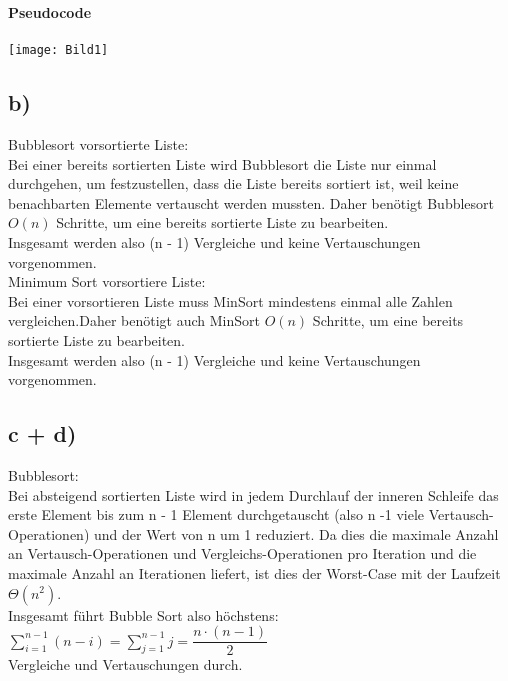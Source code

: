 \documentclass[enabledeprecatedfontcommands, a4paper]{scrartcl}
\begin{document}
\textbf{Pseudocode}\\
\\
\texttt{[image: Bild1]}\\
\newpage
\subsection*{b)}
Bubblesort vorsortierte Liste:\\
Bei einer bereits sortierten Liste wird Bubblesort die Liste nur einmal durchgehen, um festzustellen, dass die Liste bereits sortiert ist, weil keine benachbarten Elemente vertauscht werden mussten. Daher benötigt Bubblesort   ${O}(n)$  Schritte, um eine bereits sortierte Liste zu bearbeiten.\\
Insgesamt werden also (n - 1) Vergleiche und keine Vertauschungen vorgenommen.\\
\newline
Minimum Sort vorsortiere Liste:\\
Bei einer vorsortieren Liste muss MinSort mindestens einmal alle Zahlen vergleichen.Daher benötigt auch MinSort   ${O}(n)$  Schritte, um eine bereits sortierte Liste zu bearbeiten.\\
Insgesamt werden also (n - 1) Vergleiche und keine Vertauschungen vorgenommen.\\
\newpage
\subsection*{c + d)}
Bubblesort:\\
Bei absteigend sortierten Liste wird in jedem Durchlauf der inneren Schleife das erste Element bis zum n - 1 Element durchgetauscht (also n -1 viele  Vertausch-Operationen) und der Wert von n um 1 reduziert. Da dies die maximale Anzahl an Vertausch-Operationen und Vergleichs-Operationen pro Iteration und die maximale Anzahl an Iterationen liefert, ist dies der Worst-Case mit der Laufzeit $\Theta(n^{2})$.\\

Insgesamt führt Bubble Sort also höchstens:\\

$\sum_{i=1}^{n-1} (n-i) = \sum_{j=1}^{n-1} j = \dfrac{n \cdot (n-1)}{2}$\\

Vergleiche und Vertauschungen durch.\\
\end{document}
